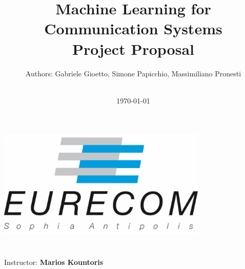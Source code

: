 \title{\Large Machine Learning for Communication Systems \\[0.5cm]
	\bf\Large Project Proposal }
\author{\large Authors: Gabriele Gioetto, Simone Papicchio, Massimiliano Pronesti\\ \ \\}
\date{\large \today}

\makeatletter
\begin{titlepage}
	\begin{center}
		{ \includegraphics[width=10cm]{../eurecom.png}}
		{\ \\ \ \\}
		\vbox{}\vspace{5cm}
		{\@title }\\[3cm] 
		{\@author}
		{\large Instructor: \bf Marios Kountoris\\ \ \\}
		{\@date\\}
		
	\end{center}
\end{titlepage}
\makeatother